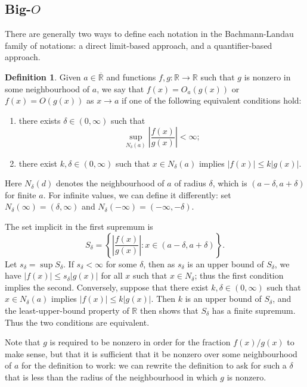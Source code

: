 \documentclass{article}
\theoremstyle{definition}
\newtheorem{definition}{Definition}
\newcommand\RR{\mathbb R}
\newcommand\RRE{\overline{\mathbb R}}
\newcommand\abs[1]{\left\lvert#1\right\rvert}
\begin{document}
\subsection{Big-$O$}\label{ssec:bigo}

There are generally two ways to define each notation in the Bachmann-Landau family of notations: a direct limit-based approach, and a quantifier-based approach.

\begin{definition}
    Given \(a\in\RRE\) and functions \(f,g:\RR\to\RR\) such that \(g\) is nonzero in some neighbourhood of \(a\), we say that \(f(x) = O_a(g(x))\) or \(f(x) = O(g(x))\) as \(x\to a\) if one of the following equivalent conditions hold:
    \begin{enumerate}
        \item there exists \(\delta\in(0,\infty)\) such that
            \[\sup_{N_{\delta}(a)} \abs{\frac{f(x)}{g(x)}} < \infty;\]
        \item there exist \(k,\delta\in(0,\infty)\) such that \(x\in N_{\delta}(a)\) implies \(\abs{f(x)} \leq k\abs{g(x)}\).
    \end{enumerate}
\end{definition}

Here \(N_{\delta}(d)\) denotes the neighbourhood of \(a\) of radius \(\delta\), which is \((a-\delta,a+\delta)\) for finite \(a\).
For infinite values, we can define it differently: set \(N_{\delta}(\infty) = (\delta,\infty)\) and \(N_{\delta}(-\infty) = (-\infty,-\delta)\).

The set implicit in the first supremum is
\[S_{\delta} = \left\{\abs{\frac{f(x)}{g(x)}} : x \in (a-\delta,a+\delta)\right\}.\]
Let \(s_{\delta} = \sup S_{\delta}\).
If \(s_{\delta} < \infty\) for some \(\delta\), then as \(s_{\delta}\) is an upper bound of \(S_{\delta}\), we have \(\abs{f(x)} \leq s_{\delta}\abs{g(x)}\) for all \(x\) such that \(x\in N_{\delta}\); thus the first condition implies the second.
Conversely, suppose that there exist \(k,\delta\in(0,\infty)\) such that \(x\in N_{\delta}(a)\) implies \(\abs{f(x)} \leq k\abs{g(x)}\).
Then \(k\) is an upper bound of \(S_{\delta}\), and the least-upper-bound property of \(\RR\) then shows that \(S_{\delta}\) has a finite supremum.
Thus the two conditions are equivalent.

Note that \(g\) is required to be nonzero in order for the fraction \(f(x)/g(x)\) to make sense, but that it is sufficient that it be nonzero over some neighbourhood of \(a\) for the definition to work: we can rewrite the definition to ask for such a \(\delta\) that is less than the radius of the neighbourhood in which \(g\) is nonzero.
\end{document}
